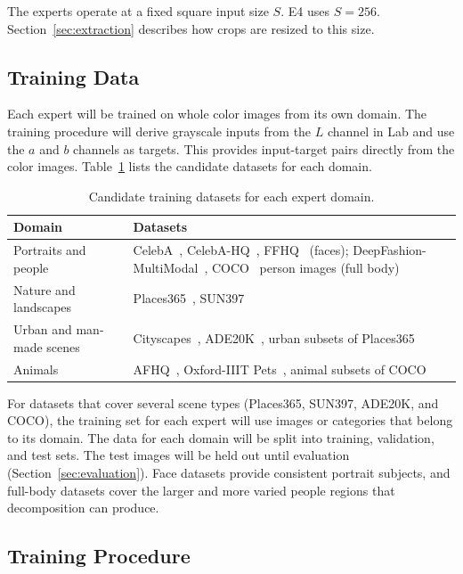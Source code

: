 \documentclass{FastFyp}
\begin{document}
The experts operate at a fixed square input size $S$. E4 uses $S=256$.
Section~\ref{sec:extraction} describes how crops are resized to this size.

\subsection{Training Data}

Each expert will be trained on whole color images from its own domain.
The training procedure will derive grayscale inputs from the $L$ channel
in Lab and use the $a$ and $b$ channels as targets. This provides
input-target pairs directly from the color images. Table~\ref{tab:datasets}
lists the candidate datasets for each domain.

\begin{table}[htbp]
    \centering
    \caption{Candidate training datasets for each expert domain.}
    \label{tab:datasets}
    \begin{tabular}{p{4.2cm}p{9cm}}
        \hline
        \textbf{Domain} & \textbf{Datasets} \\
        \hline
        Portraits and people & CelebA~\cite{celeba2015}, CelebA-HQ~\cite{pggan2018}, FFHQ~\cite{ffhq2019} (faces); DeepFashion-MultiModal~\cite{text2human2022}, COCO~\cite{ref19} person images (full body) \\
        Nature and landscapes & Places365~\cite{places365}, SUN397~\cite{sun397} \\
        Urban and man-made scenes & Cityscapes~\cite{ref20}, ADE20K~\cite{ref18}, urban subsets of Places365~\cite{places365} \\
        Animals & AFHQ~\cite{afhq2020}, Oxford-IIIT Pets~\cite{pets2012}, animal subsets of COCO~\cite{ref19} \\
        \hline
    \end{tabular}
\end{table}

For datasets that cover several scene types (Places365, SUN397, ADE20K,
and COCO), the training set for each expert will use images or categories
that belong to its domain. The data for each domain will be split into
training, validation, and test sets. The test images will be held out
until evaluation (Section~\ref{sec:evaluation}). Face datasets provide
consistent portrait subjects, and full-body datasets cover the larger
and more varied people regions that decomposition can produce.

\subsection{Training Procedure}
\label{sec:training}
\end{document}
